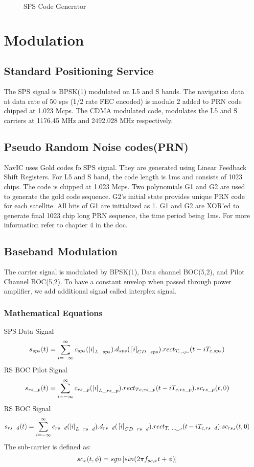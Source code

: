 	\begin{figure}[!ht]
	\centering
	
	\caption{SPS Code Generator}
	\label{figure:codeGen}
	\end{figure}


\section{Modulation}
\subsection{Standard Positioning Service}
The SPS signal is BPSK(1) modulated on L5 and S bands. The navigation data at data rate of 50 sps (1/2 rate FEC encoded) is modulo 2 added to PRN code chipped at 1.023 Mcps. The CDMA modulated code, modulates the L5 and S carriers at 1176.45 MHz and 2492.028 MHz respectively.
\subsection{Pseudo Random Noise codes(PRN)}
NavIC uses Gold codes fo SPS signal. They are generated using Linear Feedback Shift Registers. For L5 and S band, the code length is 1ms and consists of 1023 chips. The code is chipped at 1.023 Mcps. Two polynomials G1 and G2 are used to generate the gold code sequence. G2's initial state provides unique PRN code for each satellite. All bits of G1 are initialized as 1. G1 and G2 are XOR'ed to generate final 1023 chip long PRN sequence, the time period being 1ms. For more information refer to chapter 4 in the doc.
\subsection{Baseband Modulation}
The carrier signal is modulated by BPSK(1), Data channel BOC(5,2), and Pilot Channel BOC(5,2). To have a constant envelop when passed through power amplifier, we add additional signal called interplex signal.
\subsubsection{Mathematical Equations}
SPS Data Signal
\begin{equation}
	s_{sps}(t) = \sum_{i=-\infty}^{\infty} c_{sps}(\left\vert i\right\vert_{L\_sps}) . d_{sps}({}\left[i\right]_{CD\_sps}) . rect_{T_{c,sps}}(t-iT_{c,sps})
\end{equation}
RS BOC Pilot Signal
\begin{equation}
	s_{rs\_p}(t) = \sum_{i=-\infty}^{\infty} c_{rs\_p}(\left\vert i\right\vert_{L\_rs\_p}) . rect_{Tc,rs\_p}(t-iT_{c,rs\_p}). sc_{rs\_p}(t,0)
\end{equation}
RS BOC Signal
\begin{equation}
	s_{rs\_d}(t) = \sum_{i=-\infty}^{\infty} c_{rs\_d}(\left\vert i\right\vert_{L\_rs\_d}) . d_{rs\_d}({}\left[i\right]_{CD\_rs\_d}). rect_{T_{c,rs\_d}}(t-iT_{c,rs\_d}). sc_{rs_d}(t,0)
\end{equation}
The sub-carrier is defined as:
\begin{equation}
	sc_x(t,\phi) = sgn{}\left[sin(2 \pi f_{sc,x}t + \phi)\right]
\end{equation}

